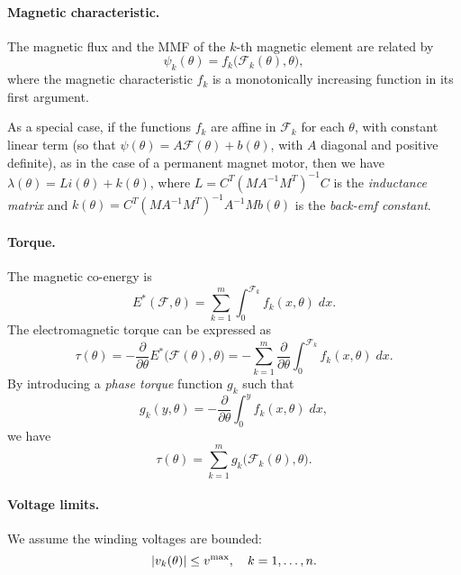 \documentclass[11pt]{article}
\begin{document}
\paragraph{Magnetic characteristic.}
The magnetic flux and the MMF of the $k$-th magnetic element are related by
\begin{equation}
\label{e-magnetic-characteristic}
\psi_k(\theta) = f_k\big(\mathcal F_k(\theta), \theta\big),
\end{equation}
where the magnetic characteristic $f_k$ 
is a monotonically increasing function in its first argument. 

As a special case, if the functions $f_k$ are affine in $\mathcal F_k$
for each $\theta$, with constant linear term
(so that $\psi(\theta) = A \mathcal F(\theta) + b(\theta)$,
with $A$ diagonal and positive definite),
as in the case of a permanent magnet motor,
then 
we have $\lambda(\theta) = Li(\theta) + k(\theta)$,
where 
$L = C^T (MA^{-1}M^T)^{-1}C$
is the \emph{inductance matrix} and 
$k(\theta) = C^T (MA^{-1}M^T)^{-1}A^{-1} Mb(\theta)$
is the \emph{back-emf constant}. 




\paragraph{Torque.}
The magnetic co-energy is
\[
E^*(\mathcal F, \theta) 
= \sum_{k=1}^m \int_0^{\mathcal F_k} f_k(x, \theta) \; dx.
\]
The electromagnetic torque can be expressed as
\begin{equation*}
\tau(\theta) 
  = -\frac{\partial}{\partial \theta} E^*\big(\mathcal F(\theta), \theta \big)
  = -\sum_{k=1}^m \frac{\partial}{\partial \theta}
    \int_0^{\mathcal F_k} f_k(x, \theta) \; dx.
\end{equation*}
By introducing a \emph{phase torque} function $g_k$ such that 
\[
g_k(y, \theta)
  = -\frac{\partial}{\partial \theta}
    \int_0^y f_k(x, \theta) \; dx,
\]
we have 
\begin{equation}
\label{e-sum-phase-torque}
\tau(\theta) = \sum_{k=1}^m g_k \big(\mathcal F_k(\theta), \theta \big).
\end{equation}

\paragraph{Voltage limits.}
We assume the winding voltages are bounded:
\begin{equation}
\label{e-voltage-limit}
| v_k(\theta) | \leq v^{\rm max}, \quad k = 1, \ldots, n.
\end{equation}
\end{document}
